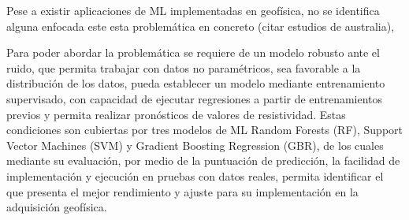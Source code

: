 Pese a existir aplicaciones de ML implementadas en geofísica, no se identifica alguna enfocada este esta problemática en concreto (citar estudios de australia), %

Para poder abordar la problemática se requiere de un modelo robusto ante el ruido, que permita trabajar con datos no paramétricos, sea favorable a la distribución de los datos, pueda establecer un modelo mediante entrenamiento supervisado, con capacidad de ejecutar regresiones a partir de entrenamientos previos y permita realizar pronósticos de valores de resistividad. Estas condiciones son cubiertas por tres modelos de ML Random Forests (RF), Support Vector Machines (SVM) y Gradient Boosting Regression (GBR), de los cuales mediante su evaluación, por medio de la puntuación de predicción, la facilidad de implementación y ejecución en pruebas con datos reales,  permita identificar el que presenta el mejor rendimiento y ajuste para su implementación en la adquisición geofísica. 
